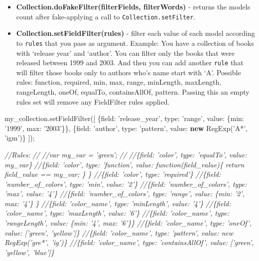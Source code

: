 \documentclass[9pt]{book}
\newenvironment{Shaded}{}{}
\newcommand{\KeywordTok}[1]{\textcolor[rgb]{0.00,0.44,0.13}{\textbf{{#1}}}}
\newcommand{\DataTypeTok}[1]{\textcolor[rgb]{0.56,0.13,0.00}{{#1}}}
\newcommand{\StringTok}[1]{\textcolor[rgb]{0.25,0.44,0.63}{{#1}}}
\newcommand{\CommentTok}[1]{\textcolor[rgb]{0.38,0.63,0.69}{\textit{{#1}}}}
\newcommand{\OtherTok}[1]{\textcolor[rgb]{0.00,0.44,0.13}{{#1}}}
\newcommand{\FunctionTok}[1]{\textcolor[rgb]{0.02,0.16,0.49}{{#1}}}
\newcommand{\NormalTok}[1]{{#1}}
\begin{document}
\begin{itemize}
\item
  \textbf{Collection.doFakeFilter(filterFields, filterWords)} - returns
  the models count after fake-applying a call to
  \texttt{Collection.setFilter}.
\item
  \textbf{Collection.setFieldFilter(rules)} - filter each value of each
  model according to \texttt{rules} that you pass as argument. Example:
  You have a collection of books with `release year' and `author'. You
  can filter only the books that were released between 1999 and 2003.
  And then you can add another \texttt{rule} that will filter those
  books only to authors who's name start with `A'. Possible rules:
  function, required, min, max, range, minLength, maxLength,
  rangeLength, oneOf, equalTo, containsAllOf, pattern. Passing this an
  empty rules set will remove any FieldFilter rules applied.
\end{itemize}

\begin{Shaded}
\begin{Highlighting}[]

  \OtherTok{my_collection}\NormalTok{.}\FunctionTok{setFieldFilter}\NormalTok{([}
    \NormalTok{\{}\DataTypeTok{field}\NormalTok{: }\StringTok{'release_year'}\NormalTok{, }\DataTypeTok{type}\NormalTok{: }\StringTok{'range'}\NormalTok{, }\DataTypeTok{value}\NormalTok{: \{}\DataTypeTok{min}\NormalTok{: }\StringTok{'1999'}\NormalTok{, }\DataTypeTok{max}\NormalTok{: }\StringTok{'2003'}\NormalTok{\}\},}
    \NormalTok{\{}\DataTypeTok{field}\NormalTok{: }\StringTok{'author'}\NormalTok{, }\DataTypeTok{type}\NormalTok{: }\StringTok{'pattern'}\NormalTok{, }\DataTypeTok{value}\NormalTok{: }\KeywordTok{new} \FunctionTok{RegExp}\NormalTok{(}\StringTok{'A*'}\NormalTok{, }\StringTok{'igm'}\NormalTok{)\}}
  \NormalTok{]);}

  \CommentTok{//Rules:}
  \CommentTok{//}
  \CommentTok{//var my_var = 'green';}
  \CommentTok{//}
  \CommentTok{//\{field: 'color', type: 'equalTo', value: my_var\}}
  \CommentTok{//\{field: 'color', type: 'function', value: function(field_value)\{ return field_value == my_var; \} \}}
  \CommentTok{//\{field: 'color', type: 'required'\}}
  \CommentTok{//\{field: 'number_of_colors', type: 'min', value: '2'\}}
  \CommentTok{//\{field: 'number_of_colors', type: 'max', value: '4'\}}
  \CommentTok{//\{field: 'number_of_colors', type: 'range', value: \{min: '2', max: '4'\} \}}
  \CommentTok{//\{field: 'color_name', type: 'minLength', value: '4'\}}
  \CommentTok{//\{field: 'color_name', type: 'maxLength', value: '6'\}}
  \CommentTok{//\{field: 'color_name', type: 'rangeLength', value: \{min: '4', max: '6'\}\}}
  \CommentTok{//\{field: 'color_name', type: 'oneOf', value: ['green', 'yellow']\}}
  \CommentTok{//\{field: 'color_name', type: 'pattern', value: new RegExp('gre*', 'ig')\}}
  \CommentTok{//\{field: 'color_name', type: 'containsAllOf', value: ['green', 'yellow', 'blue']\}}
\end{Highlighting}
\end{Shaded}
\end{document}
